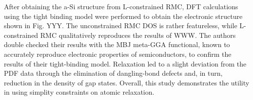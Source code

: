 \documentclass[3p,review,12pt]{elsarticle}
\begin{document}
\par 
After obtaining the a-Si structure from L-constrained RMC, DFT calculations using the tight binding model were performed to obtain the electronic structure shown in Fig. YYY. The unconstrained RMC DOS is rather featureless, while L-constrained RMC qualitatively reproduces the results of WWW. The authors double checked their results with the MBJ meta-GGA functional, known to accurately reproduce electronic properties of semiconductors, to confirm the results of their tight-binding model. Relaxation led to a slight deviation from the PDF data through the elimination of dangling-bond defects and, in turn, reduction in the density of gap states. Overall, this study demonstrates the utility in using simplity constraints on atomic relaxation.
\end{document}
